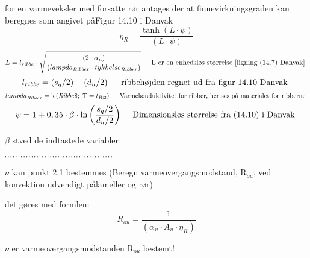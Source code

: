 \documentclass[../Hovedrapport.tex]{subfiles}
\newcommand{\F}[1]{\mbox{$#1$}}
\newcommand{\V}[1]{\mbox{$ #1 $}}
\newcommand{\I}{\mbox{\hspace{0.20in}}}
\newcommand{\conductivity}{\mathrm{k}}
\begin{document}
\vspace{0.10in}
\noindent
\rm for en varmeveksler med forsatte rør antages der at finnevirkningsgraden kan beregnes som angivet p\aa Figur 14.10 i Danvak
\begin{equation}
\label{EES Eqn:48}
\eta_{R} = \frac {\tanh{ \left( L \cdot  \psi \right) }}{  \left( L \cdot  \psi \right)  } 
\end{equation}
\begin{equation}
\label{EES Eqn:49}
L = l_{ribbe} \cdot  \sqrt{  \frac { \left( 2 \cdot  \alpha_{u} \right) }{  \left( lampda_{Ribber} \cdot  tykkelse_{Ribber} \right)  }  } 	 
\mbox{\I L er en enhedsløs størrelse [ligning (14.7) Danvak] }
\end{equation}
\begin{equation}
\label{EES Eqn:50}
l_{ribbe} =  \left( s_{q}/2 \right)  -  \left( d_{u}/2 \right) 		 
\mbox{\I ribbehøjden regnet ud fra figur 14.10 Danvak }
\end{equation}
\begin{equation}
\label{EES Eqn:51}
\V{lampda} _{Ribber}=\conductivity \left(\F{Ribbe}\$;\mbox{\ T}=t_{R;2} \right)      	 
\mbox{\I Varmekonduktivitet for ribber, her ses på materialet for ribberne }
\end{equation}
\begin{equation}
\label{EES Eqn:52}
\psi = 1 + 0,35 \cdot  \beta \cdot  \ln{ \left( \frac {s_{q}/2}{ d_{u}/2} \right) }		 
\mbox{\I Dimensionsløs størrelse fra (14.10) i Danvak }
\end{equation}

\vspace{0.10in}
\noindent
\rm $\beta$ st\aar ved de indtastede variabler

\vspace{0.10in}
\noindent
\rm $_{;;;;;;;;;;;;;;;;;;;;;;;;;;;;;;;;;;;;;;;;;}$

\vspace{0.10in}
\noindent
\rm $\nu$ kan punkt 2.1 bestemmes (Beregn varmeovergangsmodstand, R$_{ou}$, ved konvektion udvendigt p\aa lameller og rør)

\vspace{0.10in}
\noindent
\rm det gøres med formlen:
\begin{equation}
\label{EES Eqn:53}
R_{ou} = \frac {1}{  \left( \alpha_{u} \cdot  A_{u} \cdot  \eta_{R} \right)  } 
\end{equation}

\vspace{0.10in}
\noindent
\rm $\nu$ er varmeovergangsmodstanden R$_{ou}$ bestemt!
\end{document}
